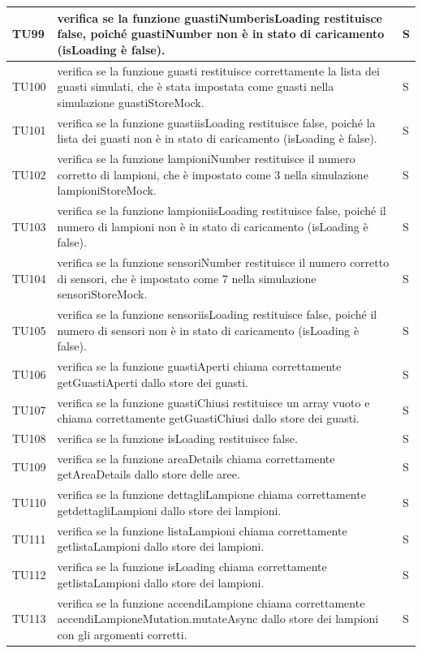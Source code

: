 \documentclass[12pt]{article}
\begin{document}
\begin{xltabular}{\linewidth}{|>{\hsize}X|X|>{\hsize}X|}
	TU99 & verifica se la funzione guastiNumberisLoading restituisce false, poiché guastiNumber non è in stato di caricamento (isLoading è false). & S \\ \hline
	TU100 & verifica se la funzione guasti restituisce correttamente la lista dei guasti simulati, che è stata impostata come guasti nella simulazione guastiStoreMock. & S \\ \hline
	TU101 & verifica se la funzione guastiisLoading restituisce false, poiché la lista dei guasti non è in stato di caricamento (isLoading è false). & S \\ \hline
	TU102 & verifica se la funzione lampioniNumber restituisce il numero corretto di lampioni, che è impostato come 3 nella simulazione lampioniStoreMock. & S \\ \hline
	TU103 & verifica se la funzione lampioniisLoading restituisce false, poiché il numero di lampioni non è in stato di caricamento (isLoading è false). & S \\ \hline
	TU104 & verifica se la funzione sensoriNumber restituisce il numero corretto di sensori, che è impostato come 7 nella simulazione sensoriStoreMock. & S \\ \hline
	TU105 & verifica se la funzione sensoriisLoading restituisce false, poiché il numero di sensori non è in stato di caricamento (isLoading è false). & S \\ \hline
	TU106 & verifica se la funzione guastiAperti chiama correttamente getGuastiAperti dallo store dei guasti. & S \\ \hline
	TU107 & verifica se la funzione guastiChiusi restituisce un array vuoto e chiama correttamente getGuastiChiusi dallo store dei guasti.  & S \\ \hline
	TU108 & verifica se la funzione isLoading restituisce false. & S \\ \hline
	TU109 & verifica se la funzione areaDetails chiama correttamente getAreaDetails dallo store delle aree.  & S \\ \hline
	TU110 & verifica se la funzione dettagliLampione chiama correttamente getdettagliLampioni dallo store dei lampioni.  & S \\ \hline
	TU111 & verifica se la funzione listaLampioni chiama correttamente getlistaLampioni dallo store dei lampioni. & S \\ \hline
	TU112 & verifica se la funzione isLoading chiama correttamente getlistaLampioni dallo store dei lampioni.  & S \\ \hline
	TU113 & verifica se la funzione accendiLampione chiama correttamente accendiLampioneMutation.mutateAsync dallo store dei lampioni con gli argomenti corretti. & S \\ \hline

\end{xltabular}
\end{document}
